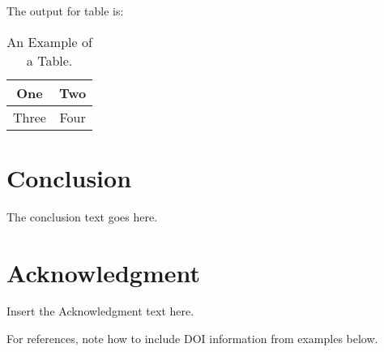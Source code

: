 \documentclass[preprint]{ptephy_v1}%
\begin{document}

\vskip2pc

\noindent The output for table is:

\begin{table}[!h]
\caption{An Example of a Table.}%
\label{table_example}
\centering
\begin{tabular}{|c||c|}%
\hline
One & Two\\ %
\hline
Three & Four\\%
\hline
\end{tabular}
\end{table}%

\section{Conclusion}
The conclusion text goes here.

\section*{Acknowledgment}

Insert the Acknowledgment text here.


%
%
%

\vspace{0.2cm}
\noindent
For references,  note how to include DOI information from examples below. 


\let\doi\relax

\end{document}
